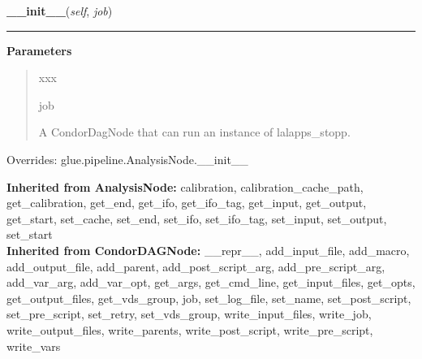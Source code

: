     \begin{boxedminipage}{\textwidth}

    \raggedright \textbf{\_\_init\_\_}(\textit{self}, \textit{job})

    \vspace{-1.5ex}

    \rule{\textwidth}{0.5\fboxrule}
    \vspace{1ex}

      \textbf{Parameters}
      \begin{quote}
        \begin{Ventry}{xxx}

          \item[job]

          A CondorDagNode that can run an instance of lalapps\_stopp.

        \end{Ventry}

      \end{quote}

    \vspace{1ex}

      Overrides: glue.pipeline.AnalysisNode.\_\_init\_\_

    \end{boxedminipage}

  \textbf{Inherited from AnalysisNode:}
    calibration,
    calibration\_cache\_path,
    get\_calibration,
    get\_end,
    get\_ifo,
    get\_ifo\_tag,
    get\_input,
    get\_output,
    get\_start,
    set\_cache,
    set\_end,
    set\_ifo,
    set\_ifo\_tag,
    set\_input,
    set\_output,
    set\_start
    \\
  \textbf{Inherited from CondorDAGNode:}
    \_\_repr\_\_,
    add\_input\_file,
    add\_macro,
    add\_output\_file,
    add\_parent,
    add\_post\_script\_arg,
    add\_pre\_script\_arg,
    add\_var\_arg,
    add\_var\_opt,
    get\_args,
    get\_cmd\_line,
    get\_input\_files,
    get\_opts,
    get\_output\_files,
    get\_vds\_group,
    job,
    set\_log\_file,
    set\_name,
    set\_post\_script,
    set\_pre\_script,
    set\_retry,
    set\_vds\_group,
    write\_input\_files,
    write\_job,
    write\_output\_files,
    write\_parents,
    write\_post\_script,
    write\_pre\_script,
    write\_vars
